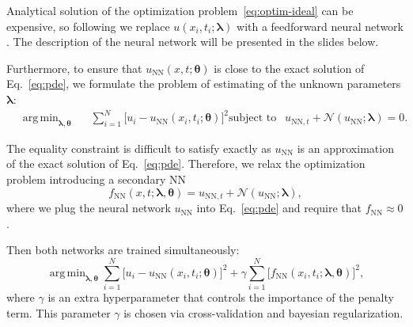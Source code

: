 \documentclass{beamer}
\def\\{}%
\renewcommand{\vec}[1]{\boldsymbol{#1}}
\newcommand{\VTheta}{\ensuremath{\vec{\theta}}}
\newcommand{\VLambda}{\ensuremath{\vec{\lambda}}}
\DeclareMathOperator*{\argmin}{arg\,min}
\newcommand{\UNN}[1][\text{NN}]{u_{#1}}
\newcommand{\FNN}[1][\text{NN}]{f_{#1}}
\newcommand{\NonlinOp}{\mathcal N\!}
\begin{document}
\begin{frame}

Analytical solution of the optimization problem~\eqref{eq:optim-ideal} can be expensive, so following \cite{raissi2017pinnII}
we replace  $u(x_i, t_i; \VLambda)$ with a 
feedforward neural network \cite{goodfellow2016deep}. The description of the neural network will be presented in the slides below.

Furthermore, to ensure that $\UNN( x, t; \VTheta)$
is close to the exact solution of Eq.~\eqref{eq:pde}, we formulate the problem of estimating of the unknown parameters
$\VLambda$:
\begin{subequations}
\label{eq:optim}
\begin{align}
    &\argmin_{\VLambda, \VTheta} \quad \ \ 
        \sum_{i=1}^N \big[u_i - \UNN(x_i, t_i; \VTheta)\big]^2  \\
    &\text{subject to } \ \ \UNN[\text{NN}, t]  + \NonlinOp(\UNN; \VLambda) = 0.
\end{align}
\end{subequations}

\end{frame}

\begin{frame}
The equality constraint is difficult to satisfy exactly as
$u_{\text{NN}}$ is an approximation of the exact solution of
Eq.~\eqref{eq:pde}.
Therefore, we relax the optimization problem introducing a secondary NN
\begin{equation}
    \FNN(x, t; \VLambda, \VTheta) =
        u_{\text{NN}, t} + \NonlinOp(u_{\text{NN}}; \VLambda),
\end{equation}
where we plug the neural network $\UNN$ into Eq.~\eqref{eq:pde} and
require that $\FNN \approx 0$.

Then both networks are trained simultaneously:
\begin{equation}
    \argmin_{\VLambda, \VTheta}
    \sum_{i=1}^N \big[ u_i - \UNN(x_i, t_i; \VTheta)\big ]^2
    +\gamma \sum_{i=1}^N \big[ \FNN(x_i, t_i; \VLambda, \VTheta) \big]^2,
\end{equation}
where $\gamma$ is an extra hyperparameter that controls the importance of the
penalty term.
This parameter $\gamma$ is chosen via cross-validation and bayesian regularization.
    
\end{frame}
\end{document}
